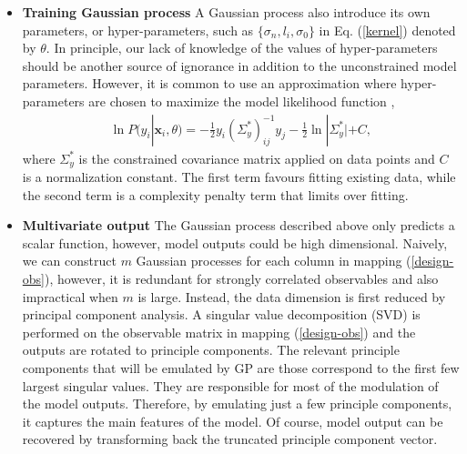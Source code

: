 \documentclass[aps,prl,twocolumn,groupedaddress]{revtex4-1}
\begin{document}
\begin{itemize}
	\item{\bf Training Gaussian process}
	A Gaussian process also introduce its own parameters, or hyper-parameters, such as $\{\sigma_n, l_i, \sigma_0\}$ in Eq. (\ref{kernel}) denoted by $\theta$. In principle, our lack of knowledge of the values of hyper-parameters should be another source of ignorance in addition to the unconstrained model parameters. However, it is common to use an approximation where hyper-parameters are chosen to maximize the model likelihood function \citep{GP-book},
	\begin{eqnarray}
		\ln P(y_i|\mathbf{x}_i, \theta) = -\frac{1}{2}y_i (\Sigma_y^*)^{-1}_{ij} y_j - \frac{1}{2}\ln|\Sigma_y^*| + C,
	\end{eqnarray}
	where $\Sigma_y^*$ is the constrained covariance matrix applied on data points and $C$ is a normalization constant. The first term favours fitting existing data, while the second term is a complexity penalty term that limits over fitting.
	
	\item{\bf Multivariate output}
	The Gaussian process described above only predicts a scalar function, however, model outputs could be high dimensional. 
	Naively, we can construct $m$ Gaussian processes for each column in mapping (\ref{design-obs}), however, it is redundant for strongly correlated observables and also impractical when $m$ is large. 
	Instead, the data dimension is first reduced by principal component analysis. A singular value decomposition (SVD) is performed on the observable matrix in mapping (\ref{design-obs}) and the outputs are rotated to principle components. 
	The relevant principle components that will be emulated by GP are those correspond to the first few largest singular values. 
	They are responsible for most of the modulation of the model outputs. Therefore, by emulating just a few principle components, it captures the main features of the model. 
	Of course, model output can be recovered by transforming back the truncated principle component vector.
	\end{itemize}
	
\end{document}
